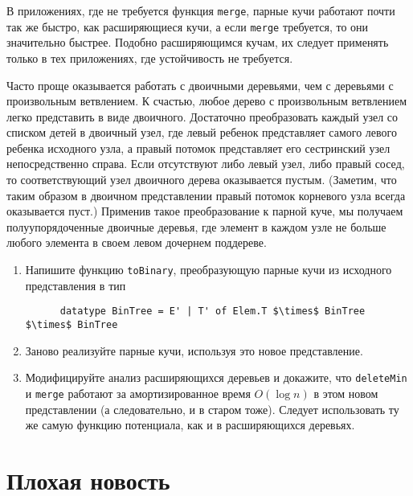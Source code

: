 \begin{hint}
  В приложениях, где не требуется функция \lstinline!merge!, парные
  кучи работают почти так же быстро, как расширяющиеся кучи, а если
  \lstinline!merge! требуется, то они значительно быстрее.  Подобно
  расширяющимся кучам, их следует применять только в тех приложениях,
  где устойчивость не требуется.
\end{hint}

\begin{exercise}\label{ex:5.8}
  Часто проще оказывается работать с двоичными деревьями, чем с деревьями с
  произвольным ветвлением. К счастью, любое дерево с произвольным
  ветвлением легко представить в виде двоичного. Достаточно
  преобразовать каждый узел со списком детей в двоичный узел, где левый ребенок
  представляет самого левого ребенка исходного узла, а правый
  потомок представляет его сестринский узел непосредственно
  справа. Если отсутствуют либо левый узел, либо правый сосед, то
  соответствующий узел двоичного дерева оказывается пустым. (Заметим,
  что таким образом в двоичном представлении правый потомок корневого
  узла всегда оказывается пуст.) Применив такое преобразование к парной
  куче, мы получаем полуупорядоченные двоичные деревья, где элемент в
  каждом узле не больше любого элемента в своем левом дочернем
  поддереве. 
  \begin{enumerate}
  \item Напишите функцию \lstinline!toBinary!, преобразующую парные
    кучи из исходного представления в тип
    \begin{lstlisting}
      datatype BinTree = E' | T' of Elem.T $\times$ BinTree $\times$ BinTree
    \end{lstlisting}
  \item Заново реализуйте парные кучи, используя это новое представление.
  \item Модифицируйте анализ расширяющихся деревьев и докажите, что
    \lstinline!deleteMin! и \lstinline!merge! работают за
    амортизированное время $O(\log n)$ в этом новом представлении (а
    следовательно, и в старом тоже). Следует использовать ту же самую
    функцию потенциала, как и в расширяющихся деревьях.
  \end{enumerate}
\end{exercise}

\section{Плохая новость}
\label{sc:5.6}

